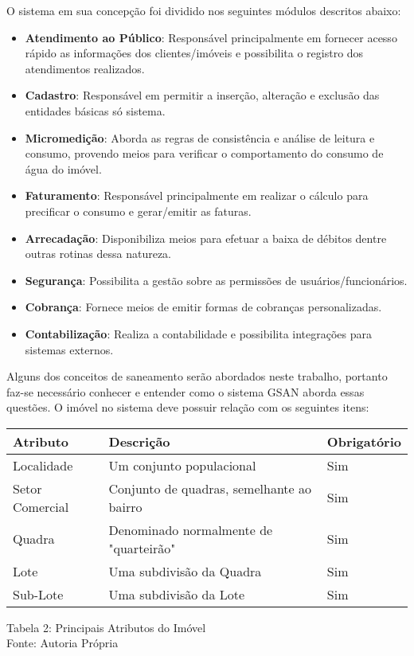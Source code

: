 O sistema em sua concepção foi dividido nos seguintes módulos descritos abaixo:

\begin{itemize}
\item \textbf{Atendimento ao Público}: Responsável principalmente em fornecer acesso rápido as informações dos clientes/imóveis e possibilita o registro dos atendimentos realizados. \\
\item \textbf{Cadastro}: Responsável em permitir a inserção, alteração e exclusão das entidades básicas só sistema. \\
\item \textbf{Micromedição}: Aborda as regras de consistência e análise de leitura e consumo, provendo meios para verificar o comportamento do consumo de água do imóvel. \\
\item \textbf{Faturamento}: Responsável principalmente em realizar o cálculo para precificar o consumo e gerar/emitir as faturas. \\
\item \textbf{Arrecadação}: Disponibiliza meios para efetuar a baixa de débitos dentre outras rotinas dessa natureza. \\
\item \textbf{Segurança}: Possibilita a gestão sobre as permissões de usuários/funcionários. \\
\item \textbf{Cobrança}: Fornece meios de emitir formas de cobranças personalizadas. \\
\item \textbf{Contabilização}: Realiza a contabilidade e possibilita integrações para sistemas externos. \\
\end{itemize}

Alguns dos conceitos de saneamento serão abordados neste trabalho, portanto faz-se necessário conhecer e entender como o sistema GSAN aborda essas questões.
O imóvel no sistema deve possuir relação com os seguintes itens:


\begin{table}[htb]
	\center
	\footnotesize
	\begin{tabular}{|p{3cm}|p{7cm}|p{2.5cm}|} \hline
		\textbf{Atributo} & \textbf{Descrição} & \textbf{Obrigatório}  \\ \hline
		Localidade & Um conjunto populacional & Sim \\	\hline
		Setor Comercial & Conjunto de quadras, semelhante ao bairro & Sim \\ \hline
		Quadra & Denominado normalmente de "quarteirão" & Sim \\ \hline			
		Lote &  Uma subdivisão da Quadra & Sim \\ \hline
		Sub-Lote &  Uma subdivisão da Lote & Sim \\ \hline
	\end{tabular}
\end{table}
\begin{center}
	Tabela 2: Principais Atributos do Imóvel \\
	Fonte: Autoria Própria
\end{center}


